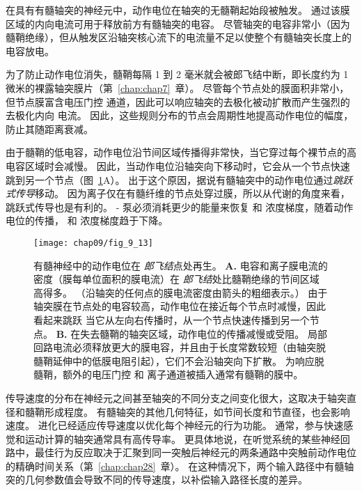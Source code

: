 在具有有髓轴突的神经元中，动作电位在轴突的无髓鞘起始段被触发。
通过该膜区域的内向电流可用于释放前方有髓轴突的电容。
尽管轴突的电容非常小（因为髓鞘绝缘），但从触发区沿轴突核心流下的电流量不足以使整个有髓轴突长度上的电容放电。


为了防止动作电位消失，髓鞘每隔 1 到 2 毫米就会被郎飞结中断，即长度约为 1 微米的裸露轴突膜片（第~\ref{chap:chap7}~章）。
尽管每个节点处的膜面积非常小，但节点膜富含电压门控  通道，因此可以响应轴突的去极化被动扩散而产生强烈的去极化内向  电流。
因此，这些规则分布的节点会周期性地提高动作电位的幅度，防止其随距离衰减。


由于髓鞘的低电容，动作电位沿节间区域传播得非常快，当它穿过每个裸节点的高电容区域时会减慢。
因此，当动作电位沿轴突向下移动时，它会从一个节点快速跳到另一个节点（图~\ref{fig:9_13}A）。
出于这个原因，据说有髓轴突中的动作电位通过\textit{跳跃式传导}移动。
因为离子仅在有髓纤维的节点处穿过膜，所以从代谢的角度来看，跳跃式传导也是有利的。
- 泵必须消耗更少的能量来恢复  和  浓度梯度，随着动作电位的传播， 和  浓度梯度趋于下降。


\begin{figure}[htbp]
	\centering
	\texttt{[image: chap09/fig\_9\_13]}
	\caption{有髓神经中的动作电位在 \textit{郎飞结}点处再生。
		\textbf{A.} 电容和离子膜电流的密度（膜每单位面积的膜电流）在 \textit{郎飞结}处比髓鞘绝缘的节间区域高得多。
		（沿轴突的任何点的膜电流密度由箭头的粗细表示。）
		由于轴突膜在节点处的电容较高，动作电位在接近每个节点时减慢，因此看起来跳跃 当它从左向右传播时，从一个节点快速传播到另一个节点。
		\textbf{B.} 在失去髓鞘的轴突区域，动作电位的传播减慢或受阻。
		局部回路电流必须释放更大的膜电容，并且由于长度常数较短（由轴突脱髓鞘延伸中的低膜电阻引起），它们不会沿轴突向下扩散。
		为响应脱髓鞘，额外的电压门控  和  离子通道被插入通常有髓鞘的膜中。}
	\label{fig:9_13}
\end{figure}


传导速度的分布在神经元之间甚至轴突的不同分支之间变化很大，这取决于轴突直径和髓鞘形成程度。
有髓轴突的其他几何特征，如节间长度和节直径，也会影响速度。
进化已经适应传导速度以优化每个神经元的行为功能。
通常，参与快速感觉和运动计算的轴突通常具有高传导率。
更具体地说，在听觉系统的某些神经回路中，最佳行为反应取决于汇聚到同一突触后神经元的两条通路中突触前动作电位的精确时间关系（第~\ref{chap:chap28}~章）。
在这种情况下，两个输入路径中有髓轴突的几何参数值会导致不同的传导速度，以补偿输入路径长度的差异。


